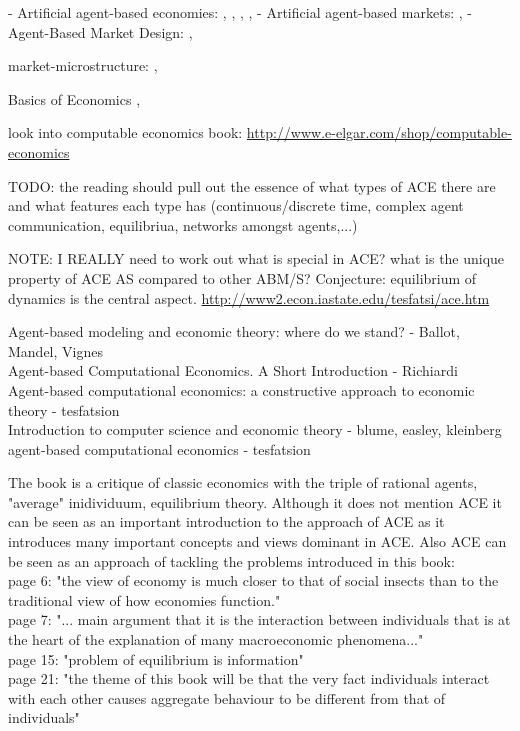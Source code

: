 - Artificial agent-based economies: \cite{tesfatsion_agent-based_2006}, \cite{gintis_emergence_2006}, \cite{gintis_dynamics_2007}, \cite{gaffeo_adaptive_2008}, \cite{botta_functional_2011}
- Artificial agent-based markets: \cite{mackie-mason_chapter_2006}, \cite{darley_nasdaq_2007}
- Agent-Based Market Design: \cite{marks_chapter_2006}, \cite{budish_editors_2015}

market-microstructure: \cite{LehalleLaruelle2013}, \cite{baker_market_2013}

Basics of Economics \cite{bowles_understanding_2005}, \cite{kirman_complex_2010}

look into computable economics book: \url{http://www.e-elgar.com/shop/computable-economics}

TODO: the reading should pull out the essence of what types of ACE there are and what features each type has (continuous/discrete time, complex agent communication, equilibriua, networks amongst agents,...)

NOTE: I REALLY need to work out what is special in ACE? what is the unique property of ACE AS compared to other ABM/S? Conjecture: equilibrium of dynamics is the central aspect.
\url{http://www2.econ.iastate.edu/tesfatsi/ace.htm}

\cite{mandel_2015} Agent-based modeling and economic theory: where do we stand? - Ballot, Mandel, Vignes \\
\cite{richiardi_2007} Agent-based Computational Economics. A Short Introduction - Richiardi \\
\cite{tesfatsion_2006} Agent-based computational economics: a constructive approach to economic theory - tesfatsion \\
\cite{kleinberg_easley_2015} Introduction to computer science and economic theory - blume, easley, kleinberg \\
\cite{tesfatsion_2002} agent-based computational economics - tesfatsion 



The book \cite{KirmanComplex2010} is a critique of classic economics with the triple of rational agents, "average" inidividuum, equilibrium theory. Although it does not mention ACE it  can be seen as an important introduction to the approach of ACE as it introduces many important concepts and views dominant in ACE. Also ACE can be seen as an approach of tackling the problems introduced in this book: \\

page 6: "the view of economy is much closer to that of social insects than to the traditional view of how economies function." \\
page 7: "... main argument that it is the interaction between individuals that is at the heart of the explanation of many macroeconomic phenomena..." \\
page 15: "problem of equilibrium is information" \\
page 21: "the theme of this book will be that the very fact individuals interact with each other causes aggregate behaviour to be different from that of individuals" \\



